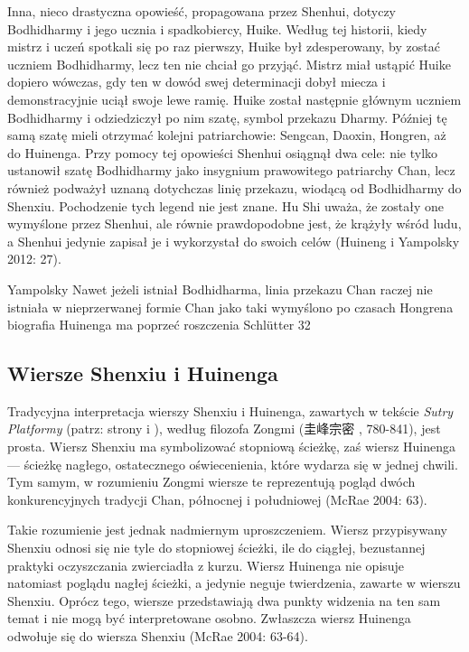 Inna, nieco drastyczna opowieść, propagowana przez Shenhui, dotyczy Bodhidharmy i jego ucznia i spadkobiercy, Huike. Według tej historii, kiedy mistrz i uczeń spotkali się po raz pierwszy, Huike był zdesperowany, by zostać uczniem Bodhidharmy, lecz ten nie chciał go przyjąć. Mistrz miał ustąpić Huike dopiero wówczas, gdy ten w dowód swej determinacji dobył miecza i demonstracyjnie uciął swoje lewe ramię. Huike został następnie głównym uczniem Bodhidharmy i odziedziczył po nim szatę, symbol przekazu Dharmy. Później tę samą szatę mieli otrzymać kolejni patriarchowie: Sengcan, Daoxin, Hongren, aż do Huinenga. Przy pomocy tej opowieści Shenhui osiągnął dwa cele: nie tylko ustanowił szatę Bodhidharmy jako insygnium prawowitego patriarchy Chan, lecz również podważył uznaną dotychczas linię przekazu, wiodącą od Bodhidharmy do Shenxiu. Pochodzenie tych legend nie jest znane. Hu Shi uważa, że zostały one wymyślone przez Shenhui, ale równie prawdopodobne jest, że krążyły wśród ludu, a Shenhui jedynie zapisał je i wykorzystał do swoich celów (Huineng i Yampolsky 2012: 27).

Yampolsky
Nawet jeżeli istniał Bodhidharma, linia przekazu Chan raczej nie istniała w nieprzerwanej formie
Chan jako taki wymyślono po czasach Hongrena
biografia Huinenga ma poprzeć roszczenia
Schlütter 32
\fi

\subsection{Wiersze Shenxiu i Huinenga}
Tradycyjna interpretacja wierszy Shenxiu i Huinenga, zawartych w tekście \textit{Sutry Platformy} (patrz: strony \pageref{ShenxiuVerse} i \pageref{HuinengVerse}), według filozofa Zongmi (圭峰宗密 , 780-841), jest prosta. Wiersz Shenxiu ma symbolizować stopniową ścieżkę, zaś wiersz Huinenga --- ścieżkę nagłego, ostatecznego oświecenienia, które wydarza się w jednej chwili. Tym samym, w rozumieniu Zongmi wiersze te reprezentują pogląd dwóch konkurencyjnych tradycji Chan, północnej i południowej (McRae 2004: 63).

Takie rozumienie jest jednak nadmiernym uproszczeniem. Wiersz przypisywany Shenxiu odnosi się nie tyle do stopniowej ścieżki, ile do ciągłej, bezustannej praktyki oczyszczania zwierciadła z kurzu. Wiersz Huinenga nie opisuje natomiast poglądu nagłej ścieżki, a jedynie neguje twierdzenia, zawarte w wierszu Shenxiu. Oprócz tego, wiersze przedstawiają dwa punkty widzenia na ten sam temat i nie mogą być interpretowane osobno. Zwłaszcza wiersz Huinenga odwołuje się do wiersza Shenxiu (McRae 2004: 63-64).

